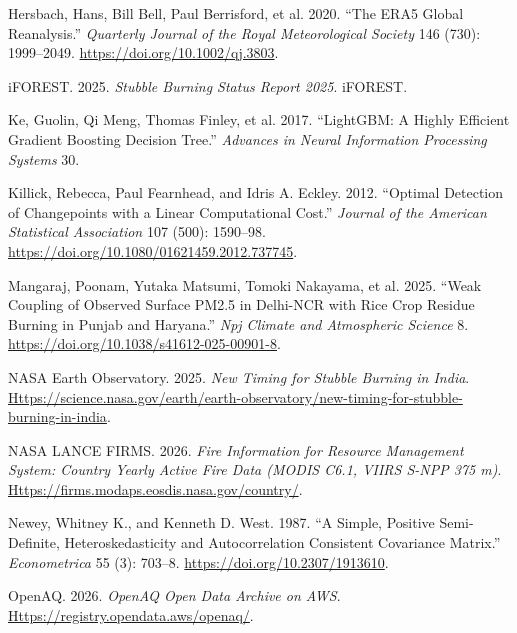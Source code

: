 \documentclass[
  11pt,
]{article}
\newlength{\cslhangindent}
\newenvironment{CSLReferences}[2] %
 {\begin{list}{}{%
  \setlength{\itemindent}{0pt}
  \setlength{\leftmargin}{0pt}
  \setlength{\parsep}{0pt}
  \ifodd #1
   \setlength{\leftmargin}{\cslhangindent}
   \setlength{\itemindent}{-1\cslhangindent}
  \fi
  \setlength{\itemsep}{#2\baselineskip}}}
 {\end{list}}
\begin{document}
\begin{CSLReferences}{1}{1}
{Hersbach, Hans, Bill Bell, Paul Berrisford, et al.} 2020. {``The {ERA5}
Global Reanalysis.''} \emph{Quarterly Journal of the Royal
Meteorological Society} 146 (730): 1999--2049.
\url{https://doi.org/10.1002/qj.3803}.

{iFOREST}. 2025. \emph{Stubble Burning Status Report 2025}. iFOREST.

Ke, Guolin, Qi Meng, Thomas Finley, et al. 2017. {``{LightGBM}: A Highly
Efficient Gradient Boosting Decision Tree.''} \emph{Advances in Neural
Information Processing Systems} 30.

Killick, Rebecca, Paul Fearnhead, and Idris A. Eckley. 2012. {``Optimal
Detection of Changepoints with a Linear Computational Cost.''}
\emph{Journal of the American Statistical Association} 107 (500):
1590--98. \url{https://doi.org/10.1080/01621459.2012.737745}.

{Mangaraj, Poonam, Yutaka Matsumi, Tomoki Nakayama, et al.} 2025.
{``Weak Coupling of Observed Surface {PM2.5} in {Delhi-NCR} with Rice
Crop Residue Burning in {Punjab} and {Haryana}.''} \emph{Npj Climate and
Atmospheric Science} 8.
\url{https://doi.org/10.1038/s41612-025-00901-8}.

NASA Earth Observatory. 2025. \emph{New Timing for Stubble Burning in
{India}}.
\href{https://science.nasa.gov/earth/earth-observatory/new-timing-for-stubble-burning-in-india}{Https://science.nasa.gov/earth/earth-observatory/new-timing-for-stubble-burning-in-india}.

NASA LANCE FIRMS. 2026. \emph{Fire Information for Resource Management
System: Country Yearly Active Fire Data ({MODIS} {C6.1}, {VIIRS} {S-NPP}
375 m)}.
\href{https://firms.modaps.eosdis.nasa.gov/country/}{Https://firms.modaps.eosdis.nasa.gov/country/}.

Newey, Whitney K., and Kenneth D. West. 1987. {``A Simple, Positive
Semi-Definite, Heteroskedasticity and Autocorrelation Consistent
Covariance Matrix.''} \emph{Econometrica} 55 (3): 703--8.
\url{https://doi.org/10.2307/1913610}.

OpenAQ. 2026. \emph{{OpenAQ} Open Data Archive on {AWS}}.
\href{https://registry.opendata.aws/openaq/}{Https://registry.opendata.aws/openaq/}.


\end{CSLReferences}
\end{document}
